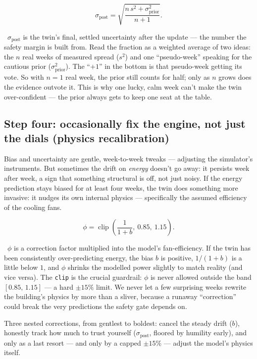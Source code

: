 \documentclass[11pt]{report}
\newcommand{\plainwords}[1]{\par\smallskip\noindent{\itshape In plain words.}~#1\par\smallskip}
\begin{document}
\begin{equation}\label{eq:ebblend}
\sigma_{\text{post}} = \sqrt{\frac{n\,s^{2} + \sigma_{\text{prior}}^{2}}{n+1}}.
\end{equation}
\plainwords{$\sigma_{\text{post}}$ is the twin's final, settled uncertainty after the update --- the number the safety margin is built from. Read the fraction as a weighted average of two ideas: the $n$ real weeks of measured spread ($s^2$) and one ``pseudo-week'' speaking for the cautious prior ($\sigma_{\text{prior}}^2$). The ``$+1$'' in the bottom is that pseudo-week getting its vote. So with $n=1$ real week, the prior still counts for half; only as $n$ grows does the evidence outvote it. This is why one lucky, calm week can't make the twin over-confident --- the prior always gets to keep one seat at the table.}

\subsection{Step four: occasionally fix the engine, not just the dials (physics recalibration)}

Bias and uncertainty are gentle, week-to-week tweaks --- adjusting the simulator's instruments. But sometimes the drift on \emph{energy} doesn't go away: it persists week after week, a sign that something structural is off, not just noisy. If the energy prediction stays biased for at least four weeks, the twin does something more invasive: it nudges its own internal physics --- specifically the assumed efficiency of the cooling fans.

\begin{equation}\label{eq:phi}
\phi = \operatorname{clip}\!\left(\frac{1}{1+b},\ 0.85,\ 1.15\right).
\end{equation}
\plainwords{$\phi$ is a correction factor multiplied into the model's fan-efficiency. If the twin has been consistently over-predicting energy, the bias $b$ is positive, $1/(1+b)$ is a little below $1$, and $\phi$ shrinks the modelled power slightly to match reality (and vice versa). The \texttt{clip} is the crucial guardrail: $\phi$ is never allowed outside the band $[0.85,\,1.15]$ --- a hard $\pm 15\%$ limit. We never let a few surprising weeks rewrite the building's physics by more than a sliver, because a runaway ``correction'' could break the very predictions the safety gate depends on.}

\begin{keyidea}
Three nested corrections, from gentlest to boldest: cancel the steady drift ($b$), honestly track how much to trust yourself ($\sigma_{\text{post}}$, floored by humility early), and only as a last resort --- and only by a capped $\pm 15\%$ --- adjust the model's physics itself.
\end{keyidea}
\end{document}
